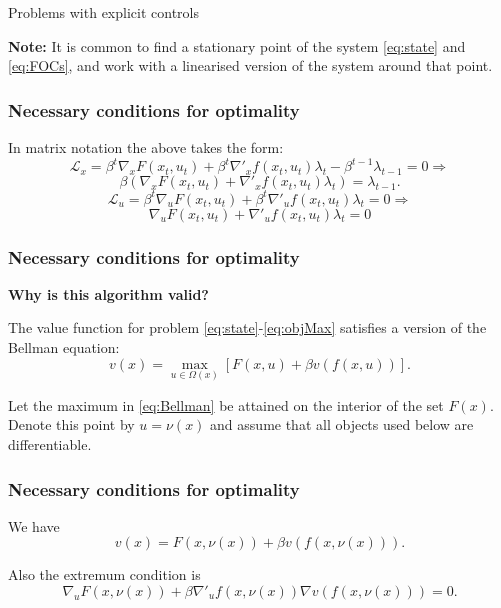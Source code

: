 \documentclass[10pt]{beamer}
\theoremstyle{definition}
\begin{document}
\begin{section}{Problems with explicit controls}
\begin{frame}[fragile]
\textbf{Note:} It is common to find a stationary point of the system \eqref{eq:state} and \eqref{eq:FOCs}, and work with a linearised version of the system around that point.
\end{frame}


\begin{frame}[fragile]
\frametitle{Necessary conditions for optimality}
In matrix notation the above takes the form:
\[ \mathcal{L}_x = \beta^t \nabla_x F(x_t,u_t)+\beta^t \nabla'_x f(x_t,u_t) \lambda_t - \beta^{t-1}\lambda_{t-1} = 0 \Rightarrow \]
\begin{equation}
\beta ( \nabla_x F(x_t,u_t)+ \nabla'_x f(x_t,u_t) \lambda_t ) = \lambda_{t-1}.
\label{eq:LagrX}
\end{equation}  \bigskip
\[ \mathcal{L}_u = \beta^t \nabla_u F (x_t,u_t)+ \beta^t \nabla'_u f(x_t,u_t) \lambda_t = 0 \Rightarrow \]
\begin{equation}
\nabla_u F (x_t,u_t)+ \nabla'_u f(x_t,u_t) \lambda_t = 0
\label{eq:LagrU}
\end{equation}
\end{frame}



\begin{frame}[fragile]
\frametitle{Necessary conditions for optimality}
\textbf{Why is this algorithm valid?}\bigskip \bigskip

The value function for problem \eqref{eq:state}-\eqref{eq:objMax} satisfies a version of the Bellman equation:
\begin{equation}
v(x) = \max_{u \in \Omega(x)}  \left[
F(x,u)+\beta v(f(x,u)) \right]. \label{eq:Bellman}
\end{equation}


Let the maximum in \eqref{eq:Bellman} be attained on the interior of the set $ F(x) $. Denote this point by $ u = \nu(x) $ and assume that all objects used below are differentiable.
\end{frame}



\begin{frame}[fragile]
\frametitle{Necessary conditions for optimality}
We have \begin{equation}
 v(x) = F(x,\nu(x)) + \beta v(f(x,\nu(x))) .
\label{eq:Bellman1}
\end{equation}

Also the extremum condition is \begin{equation}
\nabla_u F(x,\nu(x)) + \beta \nabla'_u f(x,\nu(x))  \nabla v(f(x,\nu(x))) = 0.
\label{eq:diffCntrl}
\end{equation} 


\end{frame}
\end{section}
\end{document}

